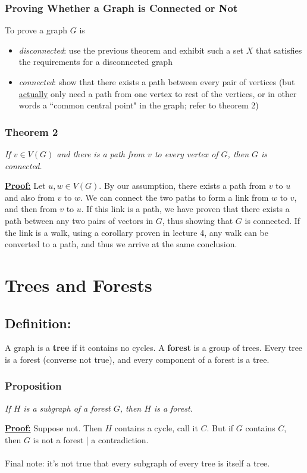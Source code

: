 \documentclass{report}
\begin{document}
\subsubsection{Proving Whether a Graph is Connected or Not}
To prove a graph $G$ is
\begin{itemize}
\item \textit{disconnected}: use the previous theorem and exhibit such a set $X$ that satisfies the requirements for a disconnected graph
\item \textit{connected}: show that there exists a path between every pair of vertices (but \underline{actually} only need a path from one vertex to rest of the vertices, or in other words a ``common central point" in the graph; refer to theorem 2) 
\end{itemize}
\subsubsection{Theorem 2}
\begin{center}
\textit{If $v \in V(G)$ and there is a path from  $v$ to every vertex of $G$, then $G$ is connected.}
\end{center}
\underline{\textbf{Proof:}} Let $u, w \in V(G)$. By our assumption, there exists a path from $v$ to $u$ and also from $v$ to $w$. We can connect the two paths to form a link from $w$ to $v$, and then from $v$ to $u$. If this link is a path, we have proven that there exists a path between any two pairs of vectors in $G$, thus showing that $G$ is connected. If the link is a walk, using a corollary proven in lecture 4, any walk can be converted to a path, and thus we arrive at the same conclusion.
\section{Trees and Forests}
\subsection{Definition:} A graph is a \textbf{tree} if it contains no cycles. A \textbf{forest} is a group of trees. Every tree is a forest (converse not true), and every component of a forest is a tree.
\subsubsection{Proposition}
\begin{center}
\textit{If $H$ is a subgraph of a forest $G$, then $H$ is a forest.}
\end{center}
\underline{\textbf{Proof:}}
Suppose not. Then $H$ contains a cycle, call it $C$. But if $G$ contains $C$, then $G$ is not a forest | a contradiction.\\\\
Final note: it's not true that every subgraph of every tree is itself a tree.
\end{document}
